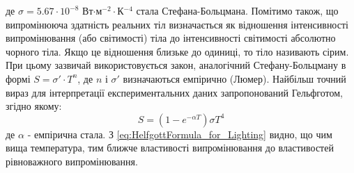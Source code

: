 \documentclass{article}
\begin{document}
де $\sigma = 5.67 \cdot 10^{-8}$ Вт$\cdot$м$^{-2}\cdot$К$^{-4}$ стала Стефана-Больцмана.
Помітимо також, що випромінююча здатність реальних тіл визначається як відношення інтенсивності випромінювання (або світимості) тіла до інтенсивності світимості абсолютно чорного тіла. Якщо це відношення близьке до одиниці, то тіло називають сірим. 
При цьому зазвичай використовується закон, аналогічний Стефану-Больцману в формі $S = \sigma'\cdot T^{n}$, де $n$ і $\sigma'$ визначаються емпірично (Люмер). Найбільш точний вираз для інтерпретації експериментальних даних запропонований Гельфготом, 
згідно якому: 
\begin{equation}
    \label{eq:HelfgottFormula_for_Lighting}
    S = \left(1 - e^{-\alpha T}\right) \sigma T^{4}
\end{equation}
де $\alpha$ - емпірична стала. З \eqref{eq:HelfgottFormula_for_Lighting} видно, що чим вища температура, тим ближче властивості випромінювання до властивостей рівноважного випромінювання.
\end{document}

